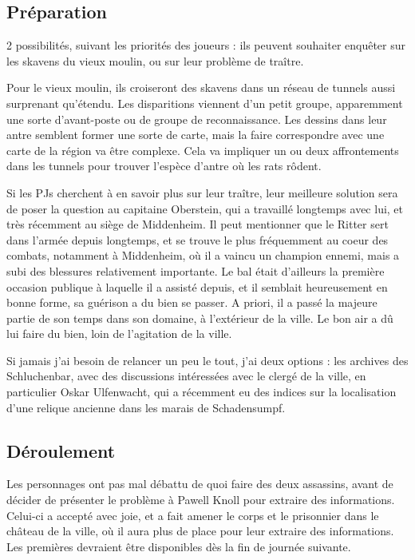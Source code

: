 \documentclass[10pt,a4paper]{book}
\begin{document}
\subsection{Préparation}
2 possibilités, suivant les priorités des joueurs : ils peuvent souhaiter enquêter sur les skavens du vieux moulin, ou sur leur problème de traître.

Pour le vieux moulin, ils croiseront des skavens dans un réseau de tunnels aussi surprenant qu'étendu. Les disparitions viennent d'un petit groupe, apparemment une sorte d'avant-poste ou de groupe de reconnaissance. Les dessins dans leur antre semblent former une sorte de carte, mais la faire correspondre avec une carte de la région va être complexe. Cela va impliquer un ou deux affrontements dans les tunnels pour trouver l'espèce d'antre où les rats rôdent.

Si les PJs cherchent à en savoir plus sur leur traître, leur meilleure solution sera de poser la question au capitaine Oberstein, qui a travaillé longtemps avec lui, et très récemment au siège de Middenheim. Il peut mentionner que le Ritter sert dans l'armée depuis longtemps, et se trouve le plus fréquemment au coeur des combats, notamment à Middenheim, où il a vaincu un champion ennemi, mais a subi des blessures relativement importante. Le bal était d'ailleurs la première occasion publique à laquelle il a assisté depuis, et il semblait heureusement en bonne forme, sa guérison a du bien se passer. A priori, il a passé la majeure partie de son temps dans son domaine, à l'extérieur de la ville. Le bon air a dû lui faire du bien, loin de l'agitation de la ville.

Si jamais j'ai besoin de relancer un peu le tout, j'ai deux options : les archives des Schluchenbar, avec des discussions intéressées avec le clergé de la ville, en particulier Oskar Ulfenwacht, qui a récemment eu des indices sur la localisation d'une relique ancienne dans les marais de Schadensumpf.
\subsection{Déroulement}
Les personnages ont pas mal débattu de quoi faire des deux assassins, avant de décider de présenter le problème à Pawell Knoll pour extraire des informations. Celui-ci a accepté avec joie, et a fait amener le corps et le prisonnier dans le château de la ville, où il aura plus de place pour leur extraire des informations. Les premières devraient être disponibles dès la fin de journée suivante.
\end{document}
